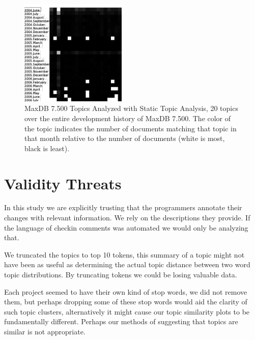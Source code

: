 \documentclass[times, 10pt,twocolumn]{article}
\begin{document}
\begin{figure}
  \centering
  \includegraphics[width=0.45\textwidth]{maxdb7500-everything-by-month}
  \caption{MaxDB 7.500 Topics Analyzed with Static Topic Analysis, 20
    topics over the entire development history of MaxDB 7.500. The
    color of the topic indicates the number of documents matching that
    topic in that month relative to the number of documents (white is
    most, black is least).}
  \label{fig:statictopics}
\end{figure}




\section{Validity Threats}

In this study we are explicitly trusting that the programmers annotate
their changes with relevant information. We rely on the descriptions
they provide. If the language of checkin comments was automated we
would only be analyzing that.

We truncated the topics to top 10 tokens, this summary of a topic
might not have been as useful as determining the actual topic distance
between two word topic distributions. By truncating tokens we could be
losing valuable data.

Each project seemed to have their own kind of stop words, we did not
remove them, but perhaps dropping some of these stop words would aid
the clarity of such topic clusters, alternatively it might cause our
topic similarity plots to be fundamentally different. Perhaps our
methods of suggesting that topics are similar is not appropriate.
\end{document}
